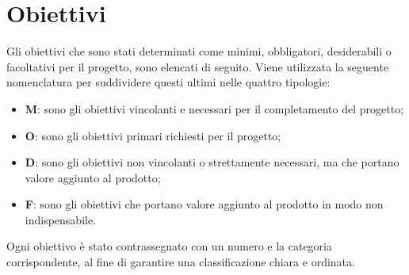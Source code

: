 \section{Obiettivi}
Gli obiettivi che sono stati determinati come minimi, obbligatori, desiderabili o facoltativi per il progetto, sono elencati di seguito.
Viene utilizzata la seguente nomenclatura per suddividere questi ultimi nelle quattro tipologie:
\begin{itemize}
    \item \textbf{M}: sono gli obiettivi vincolanti e necessari per il completamento del progetto; 
    \item \textbf{O}: sono gli obiettivi primari richiesti per il progetto;
    \item \textbf{D}: sono gli obiettivi non vincolanti o strettamente necessari, ma che portano valore aggiunto al prodotto;
    \item \textbf{F}: sono gli obiettivi che portano valore aggiunto al prodotto in modo non indispensabile.
\end{itemize}
Ogni obiettivo è stato contrassegnato con un numero e la categoria corrispondente, al fine di garantire una classificazione chiara e ordinata.
